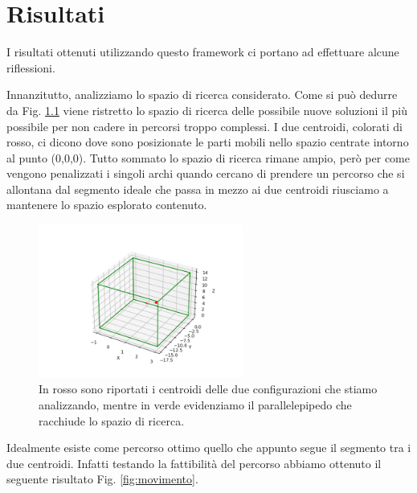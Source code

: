 \chapter{Risultati}\label{chapter:res}
I risultati ottenuti utilizzando questo framework ci portano ad effettuare alcune riflessioni. 

Innanzitutto, analizziamo lo spazio di ricerca considerato. Come si può dedurre da Fig. \ref{fig:parallelepipedo} viene ristretto lo spazio di ricerca delle possibile nuove soluzioni il più possibile per non cadere in percorsi troppo complessi. I due centroidi, colorati di rosso, ci dicono dove sono posizionate le parti mobili nello spazio centrate intorno al punto (0,0,0). Tutto sommato lo spazio di ricerca rimane ampio, però per come vengono penalizzati i singoli archi quando cercano di prendere un percorso che si allontana dal segmento ideale che passa in mezzo ai due centroidi riusciamo a mantenere lo spazio esplorato contenuto.  

\begin{figure}[H]
	\centering
	\includegraphics[width=0.6\textwidth]{Immagini/Parallelepipedo.png}
	\caption{In rosso sono riportati i centroidi delle due configurazioni che stiamo analizzando, mentre in verde evidenziamo il parallelepipedo che racchiude lo spazio di ricerca.}
	\label{fig:parallelepipedo}
\end{figure} 

Idealmente esiste come percorso ottimo quello che appunto segue il segmento tra i due centroidi. Infatti testando la fattibilità del percorso abbiamo ottenuto il seguente risultato Fig. \ref{fig:movimento}.

